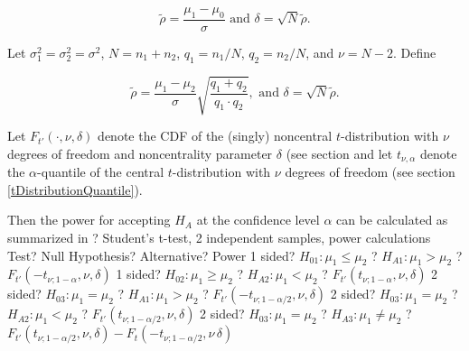 \begin{equation} \label{eq:TTestPower2irho}
	\widetilde{\rho} = \frac{\mu_1-\mu_0}{\sigma} \text{ and } \delta = \sqrt{N} \widetilde{\rho}.
\end{equation}




\vspace{0.3cm}
Let $\sigma_1^2 = \sigma_2^2 = \sigma^2$, $N = n_1 + n_2$, $q_1 = n_1 /N$, $q_2 = n_2 /N$, and $\nu=N-2$. Define

\begin{equation} \label{eq:TTestPower2i}
	\widetilde{\rho} = \frac{\mu_1-\mu_2}{\sigma} \sqrt{\frac{q_1+q_2}{q_1 \cdot q_2}}, \text{ and } \delta = \sqrt{N} \widetilde{\rho}.
\end{equation}


Let $F_{t'}\left(\cdot, \nu, \delta \right)$ denote the CDF of the (singly) noncentral $t$-distribution with $\nu$ degrees of freedom and noncentrality parameter $\delta$ (see section 
and let $t_{\nu,\alpha}$ denote the $\alpha$-quantile of the central $t$-distribution with $\nu$ degrees of freedom (see section \ref{tDistributionQuantile}).


\mpTableFourColsTwoRowsThreeRows
{Then the power for accepting $H_A$ at the confidence level $\alpha$ can be calculated as summarized in ? Student's t-test, 2 independent samples, power calculations}
{Test? Null Hypothesis? Alternative? Power}
{1 sided? $H_{01}: \mu_1 \leq \mu_2$ ? $H_{A1}: \mu_1 > \mu_2$ ? $F_{t'}\left(-t_{\nu;1-\alpha}, \nu, \delta \right)$}
{1 sided? $H_{02}: \mu_1 \geq \mu_2$ ? $H_{A2}: \mu_1 < \mu_2$ ? $F_{t'}\left(t_{\nu;1-\alpha}, \nu, \delta \right)$}
{2 sided? $H_{03}: \mu_1 = \mu_2$ ? $H_{A1}: \mu_1 > \mu_2$ ? $F_{t'}\left(-t_{\nu;1-\alpha/2}, \nu, \delta \right)$}
{2 sided? $H_{03}: \mu_1 = \mu_2$ ? $H_{A2}: \mu_1 < \mu_2$ ? $F_{t'}\left(t_{\nu;1-\alpha/2}, \nu, \delta \right)$}
{2 sided? $H_{03}: \mu_1 = \mu_2$ ? $H_{A3}: \mu_1 \neq \mu_2$ ? $F_{t'}\left(t_{\nu;1-\alpha/2}, \nu, \delta \right)-F_t\left(-t_{\nu;1-\alpha/2}, \nu\, \delta \right)$}





